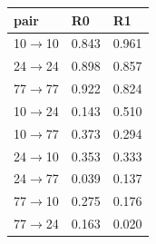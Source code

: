 \begin{tabular}{lll}
\hline
pair & R0 & R1 \\
\hline
10$\rightarrow$10 & 0.843 & 0.961 \\
24$\rightarrow$24 & 0.898 & 0.857 \\
77$\rightarrow$77 & 0.922 & 0.824 \\
10$\rightarrow$24 & 0.143 & 0.510 \\
10$\rightarrow$77 & 0.373 & 0.294 \\
24$\rightarrow$10 & 0.353 & 0.333 \\
24$\rightarrow$77 & 0.039 & 0.137 \\
77$\rightarrow$10 & 0.275 & 0.176 \\
77$\rightarrow$24 & 0.163 & 0.020 \\
\hline
\end{tabular}

